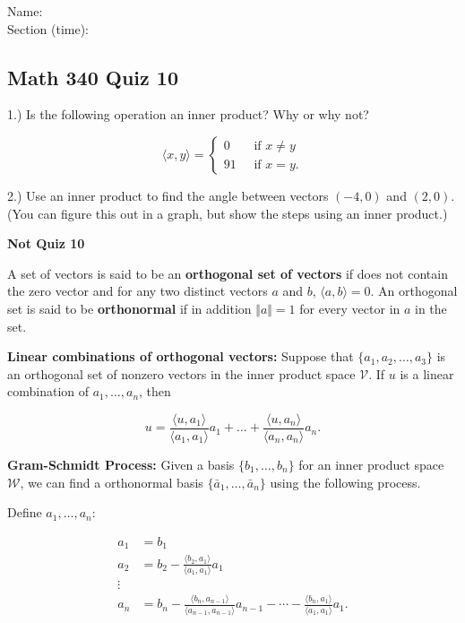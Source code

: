 \documentclass{article}
\begin{document}
Name:\\
\medskip
Section (time):

\subsection*{Math 340 Quiz 10}


1.) Is the following operation an inner product? Why or why not?

$$\langle x , y\rangle  = \begin{cases}
0 \; & \text{ if }x\neq y\\
91 \; & \text{ if }x=y.
\end{cases}$$


2.) Use an inner product to find the angle between vectors $(-4,0)$ and $(2,0)$. (You can figure this out in a graph, but show the steps using an inner product.)

\pagebreak

\textbf{Not Quiz 10}

A set of vectors is said to be an \textbf{orthogonal set of vectors} if does not contain the zero vector and for any two distinct vectors $a$ and $b$, $\langle a , b \rangle=0$. An orthogonal set is said to be \textbf{orthonormal} if in addition $\Vert a \Vert =1$ for every vector in $a$ in the set. 

\smallskip

\textbf{Linear combinations of orthogonal vectors:} Suppose that $\{a_1, a_2, \dots, a_3\}$ is an orthogonal set of nonzero vectors in the inner product space $\mathcal{V}$. If $u$ is a linear combination of $a_1, \dots, a_n$, then 

$$u = \frac{\langle u, a_1 \rangle}{\langle a_1, a_1 \rangle} a_1 + \dots + \frac{\langle u, a_n \rangle}{\langle a_n, a_n \rangle} a_n.$$

\medskip{}

\textbf{Gram-Schmidt Process:} Given a basis $\{b_1, \dots, b_n\}$ for an inner product space $\mathcal{W}$, we can find a orthonormal basis $\{\bar{a}_1, \dots, \bar{a}_n\}$ using the following process.


Define $a_1, \dots, a_n$:

\begin{align*}
a_1 &=  b_1 \\
a_2 &=  b_2 - \frac{\langle b_2, a_1 \rangle}{\langle a_1, a_1 \rangle} a_1\\
\vdots & \\
a_n &= b_n - \frac{\langle b_n, a_{n-1} \rangle}{\langle a_{n-1}, a_{n-1} \rangle} a_{n-1} - \cdots - \frac{\langle b_n, a_1 \rangle}{\langle a_1, a_1 \rangle} a_1.
\end{align*}
\end{document}
